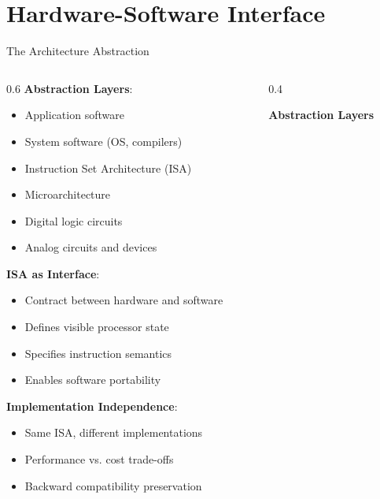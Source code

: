 \documentclass[aspectratio=169]{beamer}
\newcommand{\concept}[1]{\textbf{\color{darkblue}#1}}
\begin{document}
\section{Hardware-Software Interface}

\begin{frame}{The Architecture Abstraction}
\begin{columns}
\begin{column}{0.6\textwidth}
\concept{Abstraction Layers}:
\begin{itemize}
\item Application software
\item System software (OS, compilers)
\item Instruction Set Architecture (ISA)
\item Microarchitecture
\item Digital logic circuits
\item Analog circuits and devices
\end{itemize}

\vspace{0.3cm}
\concept{ISA as Interface}:
\begin{itemize}
\item Contract between hardware and software
\item Defines visible processor state
\item Specifies instruction semantics
\item Enables software portability
\end{itemize}

\vspace{0.3cm}
\concept{Implementation Independence}:
\begin{itemize}
\item Same ISA, different implementations
\item Performance vs. cost trade-offs
\item Backward compatibility preservation
\end{itemize}
\end{column}
\begin{column}{0.4\textwidth}
\begin{center}
\textbf{Abstraction Layers}
\vspace{0.3cm}

\end{center}
\end{column}
\end{columns}
\end{frame}
\end{document}
